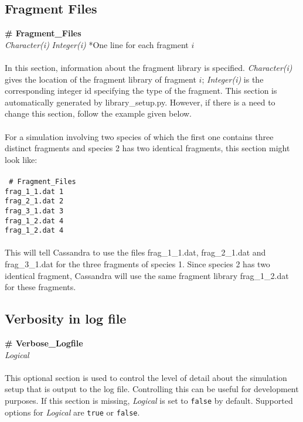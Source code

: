 \subsection{Fragment Files}\label{sec:Fragment_Files}
{\bf \# Fragment\_Files} \\
{\it Character(i)} {\it Integer(i)} *One line for each fragment $i$ \\ \\
%
In this section, information about the fragment library is specified. {\it Character(i)} gives
the location of the fragment library of fragment $i$; {\it Integer(i)} is the
corresponding integer id specifying the type of the fragment. This section is automatically
generated by library\_setup.py. However, if there is a need to change this section, follow the example
given below. \\ \\
%
For a simulation involving two species of which the first one contains three distinct fragments and species 2
has two identical fragments, this section might look like: \\ \\
%
\texttt{
\# Fragment\_Files  \\
frag\_1\_1.dat 1 \\
frag\_2\_1.dat 2 \\
frag\_3\_1.dat 3 \\
frag\_1\_2.dat 4 \\
frag\_1\_2.dat 4 \\ \\
}
%
This will tell Cassandra to use the files frag\_1\_1.dat, frag\_2\_1.dat and frag\_3\_1.dat for the three
fragments of species 1. Since species 2 has two identical fragment, Cassandra will use the same
fragment library frag\_1\_2.dat for these fragments.

%
%

\subsection{Verbosity in log file}\label{sec:Verbose_Logfile}
{\bf \# Verbose\_Logfile} \\
{\it Logical} \\ \\
%
This optional section is used to control the level of detail about the simulation
setup that is output to the log file.
Controlling this can be useful for development purposes.
If this section is missing, {\it Logical} is set to {\tt false} by default.
Supported options for {\it Logical} are {\tt true} or {\tt false}. \\ \\
%
%
%
